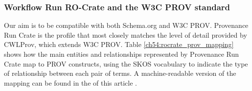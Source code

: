 \subsubsection{Workflow Run RO-Crate and the W3C PROV standard}
\label{ch54:prov}

Our aim is to be compatible with both Schema.org and W3C PROV. Provenance Run Crate is the profile that most closely matches the level of detail provided by CWLProv, which extends W3C PROV. Table \vref{ch54:rocrate_prov_mapping} shows how the main entities and relationships represented by Provenance Run Crate map to PROV constructs, using the SKOS vocabulary to indicate the type of relationship between each pair of terms. A machine-readable version of the mapping can be found in the  of this article \cite{Leo 2023c}.

